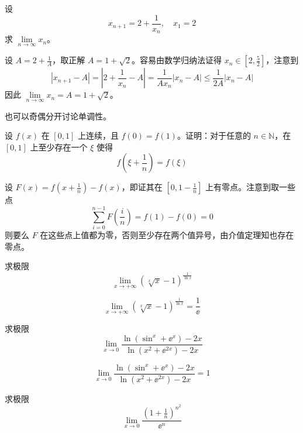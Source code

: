 \begin{problem}[000030]
设
\[ x_{n+1} = 2 + \frac{1}{x_n}, \quad x_1 = 2 \]
求 $\lim\limits_{n \to \infty} x_n$。
\end{problem}

\begin{solution}
	设 $A = 2 + \frac{1}{A}$，取正解 $A = 1 + \sqrt{2}$。容易由数学归纳法证得 $x_n \in [2, \frac{5}{2}]$，注意到
	\[ |x_{n+1} - A| = \left|2 + \frac{1}{x_n} - A\right| = \frac{1}{Ax_n} |x_n - A| \leqslant \frac{1}{2A} |x_n - A| \]
	因此 $\lim\limits_{n \to \infty} x_n = A = 1 + \sqrt{2}$。

	也可以奇偶分开讨论单调性。
\end{solution}

\begin{problem}[000031]
设 $f(x)$ 在 $[0, 1]$ 上连续，且 $f(0) = f(1)$。证明：对于任意的 $n \in \mathbb{N}$，在 $[0, 1]$ 上至少存在一个 $\xi$ 使得
\[ f\left(\xi + \frac{1}{n}\right) = f(\xi) \]
\end{problem}

\begin{solution}
	设 $F(x) = f(x + \frac{1}{n}) - f(x)$，即证其在 $[0, 1 - \frac{1}{n}]$ 上有零点。注意到取一些点
	\[ \sum_{i=0}^{n - 1} F \left(\frac{i}{n}\right) = f(1) - f(0) = 0 \]
	则要么 $F$ 在这些点上值都为零，否则至少存在两个值异号，由介值定理知也存在零点。
\end{solution}

\begin{problem}[000059]
求极限
\[ \lim_{x \to +\infty} \left(\sqrt[x]{x} - 1\right)^{\frac{1}{\ln x}} \]
\end{problem}

\begin{solution}
	\[ \lim_{x \to +\infty} \left(\sqrt[x]{x} - 1\right)^{\frac{1}{\ln x}} = \frac{1}{\ee} \]
\end{solution}

\begin{problem}[000060]
求极限
\[ \lim_{x \to 0} \frac{\ln(\sin^ x + \ee^x) - 2x}{\ln(x^2 + \ee^{2x}) - 2x} \]
\end{problem}

\begin{solution}
	\[ \lim_{x \to 0} \frac{\ln(\sin^ x + \ee^x) - 2x}{\ln(x^2 + \ee^{2x}) - 2x} = 1 \]
\end{solution}

\begin{problem}[000066]
求极限
\[ \lim_{x \to 0} \frac{\left(1+\frac{1}{n}\right)^{n^2}}{\ee^n} \]
\end{problem}

